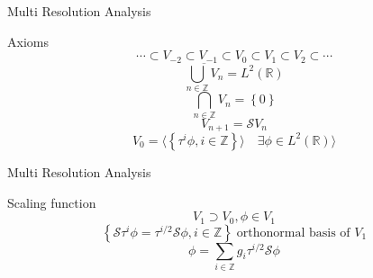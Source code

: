     \begin{frame}{Multi Resolution Analysis}
        \begin{block}{Axioms}
            \begin{equation}
                \cdots \subset V_{-2} \subset V_{-1} \subset V_0 \subset V_1 \subset V_2 \subset \cdots
            \end{equation}
            \begin{equation}
                \overline{\bigcup\limits_{n \in \mathbb{Z}} V_n} = L^2\left(\mathbb{R}\right)
            \end{equation}
            \begin{equation}
                \bigcap\limits_{n \in \mathbb{Z}} V_n = \left\{0\right\}
            \end{equation}
            \begin{equation}
                V_{n+1} = \mathcal{S}V_n
            \end{equation}
            \begin{equation}
                V_0 = \langle \left\{\tau^i\phi, i \in \mathbb{Z}\right\} \rangle \quad \exists \phi \in L^2\left(\mathbb{R}\right)\rangle
            \end{equation}
        \end{block}
    \end{frame}

    \begin{frame}{Multi Resolution Analysis}
        \begin{block}{Scaling function}
            \begin{equation}
                V_1 \supset V_0, \phi \in V_1
            \end{equation}
            \begin{equation}
                \left\{\mathcal{S}\tau^i\phi = \tau^{i/2}\mathcal{S}\phi, i \in \mathbb{Z}\right\} \; \text{orthonormal basis of } V_1
            \end{equation}
            \begin{equation}
                    \phi = \sum_{i \in \mathbb{Z}} g_i \tau^{i/2} \mathcal{S} \phi
            \end{equation}
        \end{block}
    \end{frame}

